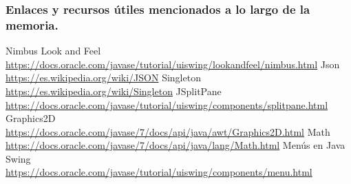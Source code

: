 \begin{thebibliography}{9}
\subsubsection*{Enlaces y recursos útiles mencionados a lo largo de la memoria.}

Nimbus Look and Feel
\\\url{https://docs.oracle.com/javase/tutorial/uiswing/lookandfeel/nimbus.html}
Json
\\\url{https://es.wikipedia.org/wiki/JSON}
Singleton
\\\url{https://es.wikipedia.org/wiki/Singleton}
JSplitPane
\\\url{https://docs.oracle.com/javase/tutorial/uiswing/components/splitpane.html}
Graphics2D
\\\url{https://docs.oracle.com/javase/7/docs/api/java/awt/Graphics2D.html}
Math
\\\url{https://docs.oracle.com/javase/7/docs/api/java/lang/Math.html}
Menús en Java Swing
\\\url{https://docs.oracle.com/javase/tutorial/uiswing/components/menu.html}
\end{thebibliography}